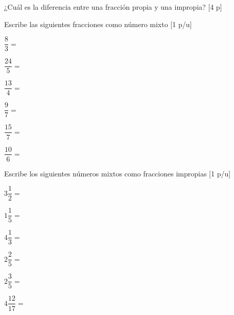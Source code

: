 \documentclass{cli-guia}
\begin{document}
\begin{problemas}
  \problema ¿Cuál es la diferencia entre una fracción propia y una impropia? [4 p]
  \begin{respuesta}[height=2cm,enlarge top by=5pt]
  \end{respuesta}

  \problema Escribe las siguientes fracciones como número mixto [1 p/u]
  \begin{alternativasgraficas}[]
      \grafica 
      \begin{malla}[height=2cm,enlarge top by=10pt]
        $\dfrac{8}{3}=$
      \end{malla}
      \grafica 
      \begin{malla}[height=2cm,enlarge top by=10pt]
        $\dfrac{24}{5}=$
      \end{malla}
      \grafica 
      \begin{malla}[height=2cm,enlarge top by=10pt]
        $\dfrac{13}{4}=$
      \end{malla}
      \grafica 
      \begin{malla}[height=2cm,enlarge top by=10pt]
        $\dfrac{9}{7}=$
      \end{malla}
      \grafica 
      \begin{malla}[height=2cm,enlarge top by=10pt]
        $\dfrac{15}{7}=$
      \end{malla}
      \grafica 
      \begin{malla}[height=2cm,enlarge top by=10pt]
        $\dfrac{10}{6}=$
      \end{malla}
    \end{alternativasgraficas} 

    

  \problema Escribe los siguientes números mixtos como fracciones impropias [1 p/u]
  \begin{alternativasgraficas}[]
      \grafica 
      \begin{malla}[height=2cm,enlarge top by=10pt]
        $3\dfrac{1}{2}=$
      \end{malla}
      \grafica 
      \begin{malla}[height=2cm,enlarge top by=10pt]
        $1\dfrac{1}{5}=$
      \end{malla}
      \grafica 
      \begin{malla}[height=2cm,enlarge top by=10pt]
        $4\dfrac{1}{3}=$
      \end{malla}
      \grafica 
      \begin{malla}[height=2cm,enlarge top by=10pt]
        $2\dfrac{2}{5}=$
      \end{malla}
      \grafica 
      \begin{malla}[height=2cm,enlarge top by=10pt]
        $2\dfrac{3}{5}=$
      \end{malla}
      \grafica 
      \begin{malla}[height=2cm,enlarge top by=10pt]
        $4\dfrac{12}{17}=$
      \end{malla}
  \end{alternativasgraficas} 



\end{problemas}
\end{document}
